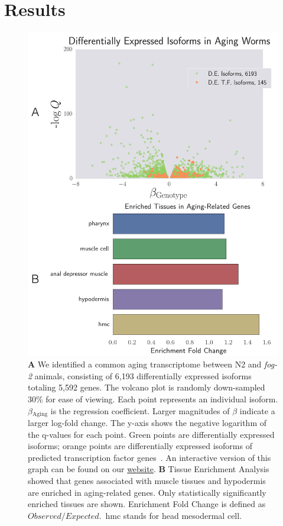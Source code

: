 \documentclass[10pt,letterpaper,twocolumn]{article}
\newcommand{\fog}{\emph{\mbox{fog-2}}}
\newcommand{\agen}{5,592}
\newcommand{\webref}{
\href{https://wormlabcaltech.github.io/Angeles_Leighton_2016/}{website}}
\begin{document}
\section*{Results}
\label{sec:results}
\begin{figure}[htbp]
\renewcommand{\familydefault}{\sfdefault}\normalfont{}
\centering
\includegraphics[width=\linewidth]{../output/figs/final_figs/aging_transcriptomics.pdf}
\caption{\textbf{A} We identified a common aging transcriptome between N2 and
\fog{} animals, consisting of 6,193 differentially expressed isoforms totaling
\agen{} genes. The volcano plot is randomly down-sampled 30\% for ease of
viewing. Each point represents an individual isoform. $\beta{}_\mathrm{Aging}$
is the regression coefficient. Larger magnitudes of $\beta$ indicate a larger
log-fold change. The y-axis shows the negative logarithm of the q-values for
each point. Green points are differentially expressed isoforms; orange points
are differentially expressed isoforms of  predicted transcription factor
genes~\cite{Reece-Hoyes2005}. An interactive version of this graph can be found
on our \webref{}. \textbf{B} Tissue Enrichment
Analysis~\cite{Angeles-Albores2016} showed that genes associated with muscle
tissues and hypodermis are enriched in aging-related genes.
Only statistically significantly enriched tissues are shown. Enrichment Fold
Change is defined as $Observed/Expected$.\ hmc stands for head mesodermal cell.
}
\label{fig:agingtranscriptome}
\end{figure}
\end{document}
